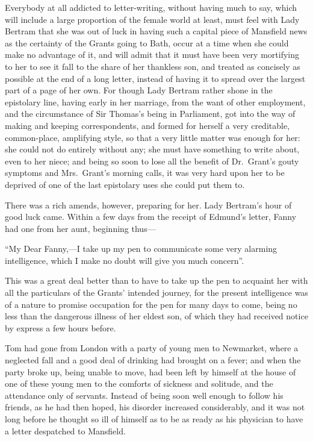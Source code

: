 \documentclass{article}
\begin{document}
Everybody at all addicted to letter-writing, without
having much to say, which will include a large proportion
of the female world at least, must feel with Lady Bertram
that she was out of luck in having such a capital piece of
Mansfield news as the certainty of the Grants going to Bath,
occur at a time when she could make no advantage of it,
and will admit that it must have been very mortifying
to her to see it fall to the share of her thankless son,
and treated as concisely as possible at the end of a
long letter, instead of having it to spread over the largest
part of a page of her own.  For though Lady Bertram rather
shone in the epistolary line, having early in her marriage,
from the want of other employment, and the circumstance
of Sir Thomas's being in Parliament, got into the way
of making and keeping correspondents, and formed for
herself a very creditable, common-place, amplifying style,
so that a very little matter was enough for her:  she could
not do entirely without any; she must have something
to write about, even to her niece; and being so soon
to lose all the benefit of Dr.\ Grant's gouty symptoms
and Mrs.\ Grant's morning calls, it was very hard upon her
to be deprived of one of the last epistolary uses she could put
them to.

There was a rich amends, however, preparing for her.
Lady Bertram's hour of good luck came.  Within a few days
from the receipt of Edmund's letter, Fanny had one from
her aunt, beginning thus---%

``My Dear Fanny,---I take up my pen to communicate some
very alarming intelligence, which I make no doubt will
give you much concern''.

This was a great deal better than to have to take up the pen
to acquaint her with all the particulars of the Grants'
intended journey, for the present intelligence was of a
nature to promise occupation for the pen for many days
to come, being no less than the dangerous illness of her
eldest son, of which they had received notice by express
a few hours before.

Tom had gone from London with a party of young men
to Newmarket, where a neglected fall and a good deal
of drinking had brought on a fever; and when the party
broke up, being unable to move, had been left by himself
at the house of one of these young men to the comforts of
sickness and solitude, and the attendance only of servants.
Instead of being soon well enough to follow his friends,
as he had then hoped, his disorder increased considerably,
and it was not long before he thought so ill of himself
as to be as ready as his physician to have a letter
despatched to Mansfield.
\end{document}

